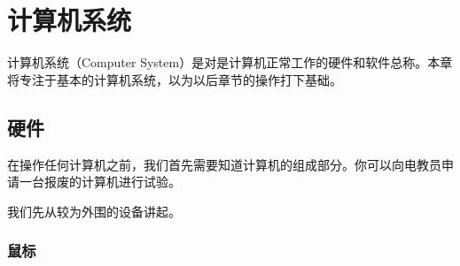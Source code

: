 \chapter{计算机系统}
计算机系统（Computer System）是对是计算机正常工作的硬件和软件总称。本章将专注于基本的计算机系统，以为以后章节的操作打下基础。
\section{硬件}
在操作任何计算机之前，我们首先需要知道计算机的组成部分。你可以向电教员申请一台报废的计算机进行试验。\par
我们先从较为外围的设备讲起。
\subsection{鼠标}
